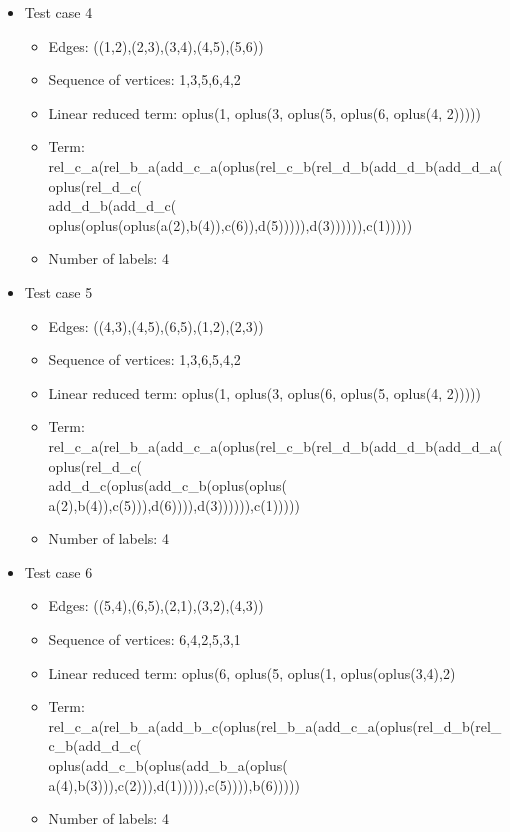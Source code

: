 \documentclass[a4paper, 12pt]{article}
\begin{document}
\begin{itemize}
\item Test case 4
	\begin{itemize}
		\item Edges: ((1,2),(2,3),(3,4),(4,5),(5,6))
		\item Sequence of vertices: 1,3,5,6,4,2
		\item Linear reduced term: oplus(1, oplus(3, oplus(5, oplus(6, oplus(4, 2)))))
		\item Term: rel\_c\_a(rel\_b\_a(add\_c\_a(oplus(rel\_c\_b(rel\_d\_b(add\_d\_b(add\_d\_a(oplus(rel\_d\_c( \\
add\_d\_b(add\_d\_c( oplus(oplus(oplus(a(2),b(4)),c(6)),d(5))))),d(3)))))),c(1)))))
		\item Number of labels: 4
	\end{itemize}

\item Test case 5
	\begin{itemize}
		\item Edges: ((4,3),(4,5),(6,5),(1,2),(2,3))
		\item Sequence of vertices: 1,3,6,5,4,2
		\item Linear reduced term: oplus(1, oplus(3, oplus(6, oplus(5, oplus(4, 2)))))
		\item Term: rel\_c\_a(rel\_b\_a(add\_c\_a(oplus(rel\_c\_b(rel\_d\_b(add\_d\_b(add\_d\_a(oplus(rel\_d\_c( \\
add\_d\_c(oplus(add\_c\_b(oplus(oplus( a(2),b(4)),c(5))),d(6)))),d(3)))))),c(1)))))
		\item Number of labels: 4
	\end{itemize}

\item Test case 6
	\begin{itemize}
		\item Edges: ((5,4),(6,5),(2,1),(3,2),(4,3))
		\item Sequence of vertices: 6,4,2,5,3,1
		\item Linear reduced term: oplus(6, oplus(5, oplus(1, oplus(oplus(3,4),2)
		\item Term: rel\_c\_a(rel\_b\_a(add\_b\_c(oplus(rel\_b\_a(add\_c\_a(oplus(rel\_d\_b(rel\_c\_b(add\_d\_c( \\
oplus(add\_c\_b(oplus(add\_b\_a(oplus( a(4),b(3))),c(2))),d(1))))),c(5)))),b(6))))) 
		\item Number of labels: 4
	\end{itemize}


\end{itemize}
\end{document}
